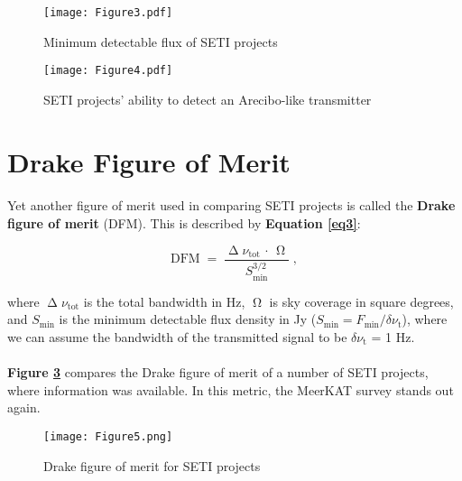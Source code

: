 \documentclass{article}
\begin{document}
\begin{figure}[H]
\begin{center}
\texttt{[image: Figure3.pdf]}
\caption{Minimum detectable flux of SETI projects \textbf{\label{fig4}}}
\end{center}
\end{figure}

\begin{figure}[H]
\begin{center}
\texttt{[image: Figure4.pdf]}
\caption{SETI projects' ability to detect an Arecibo-like transmitter \textbf{\label{fig5}}}
\end{center}
\end{figure}


\section{Drake Figure of Merit}

\paragraph{}
Yet another figure of merit used in comparing SETI projects is called the \textbf{Drake figure of merit} (DFM). This is described by \textbf{Equation \ref{eq3}}:

\begin{equation}
\textrm{DFM} \; = \; \frac{\upDelta \nu_{\textrm{tot}} \, \cdot \, \upOmega}{S_{\textrm{min}}^{3/2}} \; ,
\label{eq3}
\end{equation}

where $\upDelta \nu_{\textrm{tot}}$ is the total bandwidth in Hz, $\upOmega$ is sky coverage in square degrees, and $S_{\textrm{min}}$ is the minimum detectable flux density in Jy ($S_{\textrm{min}} = F_{\textrm{min}} / \delta \nu_{\textrm{t}}$), where we can assume the bandwidth of the transmitted signal to be $\delta \nu_{\textrm{t}}$ = 1 Hz.

\paragraph{}
\textbf{Figure \ref{fig6}} compares the Drake figure of merit of a number of SETI projects, where information was available. In this metric, the MeerKAT survey stands out again.

\begin{figure}[H]
\begin{center}
\texttt{[image: Figure5.png]}
\caption{Drake figure of merit for SETI projects \textbf{\label{fig6}}}
\end{center}
\end{figure}
\end{document}
